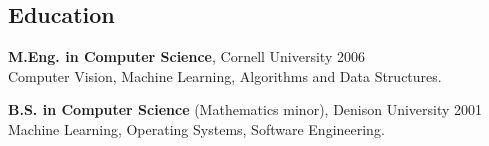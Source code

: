 \documentclass[10pt]{article}
\begin{document}
\subsection*{Education}
\begin{itemize}
\begin{item}
  \textbf{M.Eng. in Computer Science}, Cornell University 2006
	\\
	Computer Vision, Machine Learning, Algorithms and Data Structures.
\end{item}
\begin{item}
  \textbf{B.S. in Computer Science} (Mathematics minor), Denison University 2001\\
	Machine Learning, Operating Systems, Software Engineering.
\end{item}  
\end{itemize}
\end{document}
